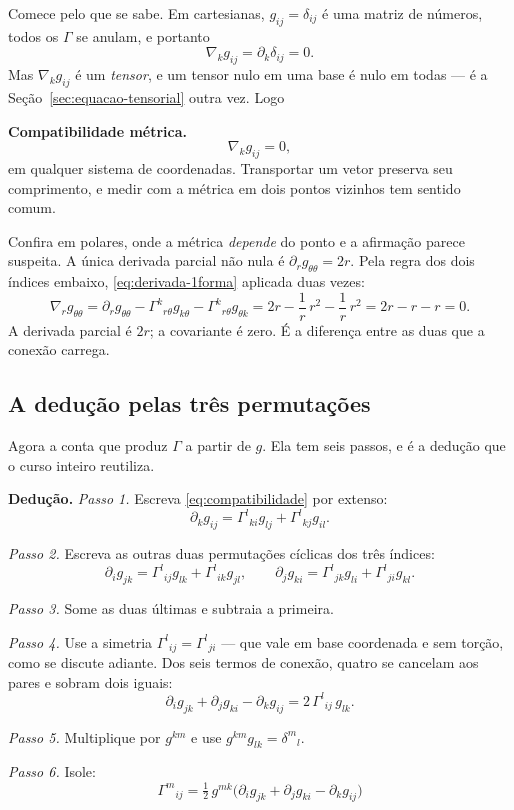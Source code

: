 \documentclass[12pt,a4paper,oneside]{book}
\theoremstyle{rgplain}
\theoremstyle{rgremark}
\begin{document}
Comece pelo que se sabe. Em cartesianas, $g_{ij}=\delta_{ij}$ é uma matriz de
números, todos os $\Gamma$ se anulam, e portanto
\[
  \nabla_kg_{ij}=\partial_k\delta_{ij}=0 .
\]
Mas $\nabla_kg_{ij}$ é um \emph{tensor}, e um tensor nulo em uma base é nulo
em todas --- é a Seção~\ref{sec:equacao-tensorial} outra vez. Logo

\begin{central}
\textbf{Compatibilidade métrica.}
\begin{equation}
  \nabla_kg_{ij}=0 ,
  \label{eq:compatibilidade}
\end{equation}
em qualquer sistema de coordenadas. Transportar um vetor preserva seu
comprimento, e medir com a métrica em dois pontos vizinhos tem sentido comum.
\end{central}

Confira em polares, onde a métrica \emph{depende} do ponto e a afirmação
parece suspeita. A única derivada parcial não nula é
$\partial_rg_{\theta\theta}=2r$. Pela regra dos dois índices embaixo,
\eqref{eq:derivada-1forma} aplicada duas vezes:
\[
  \nabla_rg_{\theta\theta}
  =\partial_rg_{\theta\theta}
  -\Gamma^k{}_{r\theta}g_{k\theta}
  -\Gamma^k{}_{r\theta}g_{\theta k}
  =2r-\frac1r\,r^2-\frac1r\,r^2
  =2r-r-r=0 .
\]
A derivada parcial é $2r$; a covariante é zero. É a diferença entre as duas
que a conexão carrega.

\subsection*{A dedução pelas três permutações}

Agora a conta que produz $\Gamma$ a partir de $g$. Ela tem seis passos, e é a dedução que o curso inteiro reutiliza.

\begin{resultado}
\textbf{Dedução.} \emph{Passo 1.} Escreva \eqref{eq:compatibilidade} por
extenso:
\[
  \partial_kg_{ij}
  =\Gamma^l{}_{ki}g_{lj}+\Gamma^l{}_{kj}g_{il} .
\]

\emph{Passo 2.} Escreva as outras duas permutações cíclicas dos três índices:
\[
  \partial_ig_{jk}=\Gamma^l{}_{ij}g_{lk}+\Gamma^l{}_{ik}g_{jl} ,
  \qquad
  \partial_jg_{ki}=\Gamma^l{}_{jk}g_{li}+\Gamma^l{}_{ji}g_{kl} .
\]

\emph{Passo 3.} Some as duas últimas e subtraia a primeira.

\emph{Passo 4.} Use a simetria $\Gamma^l{}_{ij}=\Gamma^l{}_{ji}$ --- que vale
em base coordenada e sem torção, como se discute adiante. Dos seis termos de
conexão, quatro se cancelam aos pares e sobram dois iguais:
\[
  \partial_ig_{jk}+\partial_jg_{ki}-\partial_kg_{ij}
  =2\,\Gamma^l{}_{ij}\,g_{lk} .
\]

\emph{Passo 5.} Multiplique por $g^{km}$ e use
$g^{km}g_{lk}=\delta^m{}_l$.

\emph{Passo 6.} Isole:
\begin{equation}
  \boxed{\ \Gamma^m{}_{ij}
  =\tfrac12\,g^{mk}\bigl(\partial_ig_{jk}+\partial_jg_{ki}
  -\partial_kg_{ij}\bigr)\ }
  \label{eq:christoffel}
\end{equation}
\end{resultado}
\end{document}
